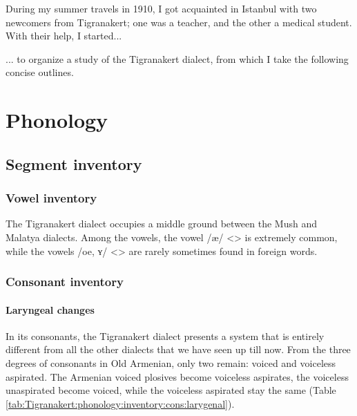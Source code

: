 During my summer travels in 1910, I got acquainted in Istanbul with two newcomers from Tigranakert; one was a teacher, and the other a medical student. With their help, I started... 

\begin{adjarianpage}\label{page:160}\end{adjarianpage}%

... to organize a study of the Tigranakert dialect, from which I take the following concise outlines. 

\section{Phonology}

\subsection{Segment inventory}

\subsubsection{Vowel inventory}

The Tigranakert dialect occupies a middle ground between the Mush and Malatya dialects. Among the vowels, the vowel /æ/ <> is extremely common, while the vowels /oe, ʏ/ <> are rarely sometimes found in foreign words. 

\subsubsection{Consonant inventory}

\paragraph{Laryngeal changes}
In its consonants, the Tigranakert dialect presents a system that is entirely different from all the other dialects that we have seen up till now. From the three degrees of consonants in Old Armenian, only two remain: voiced and voiceless aspirated. The Armenian voiced plosives become voiceless aspirates, the voiceless unaspirated become voiced, while the voiceless aspirated stay the same (Table \ref{tab:Tigranakert:phonology:inventory:cons:larygenal}). 


